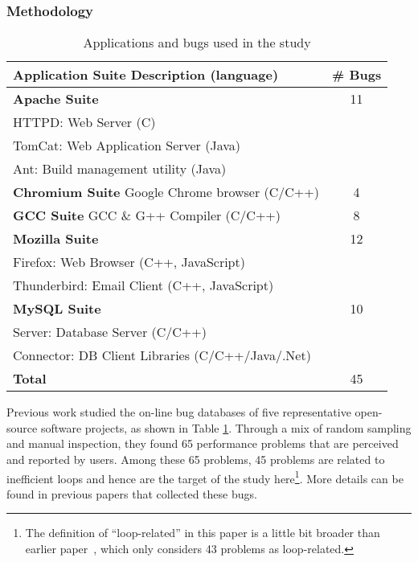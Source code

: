 \subsubsection{Methodology}
\begin{table}[h!]
\small{
\centering
\begin{tabular}{@{\hspace{3pt}}l@{\hspace{3pt}}|@{\hspace{3pt}}c@{\hspace{3pt}}}
\hline
Application Suite Description (language) & \# Bugs \\
\hline                            
{\bf Apache Suite} 	 & 11\\
{HTTPD:	Web Server (C)	}& \\
{TomCat:  Web Application Server (Java)}& \\
{Ant:	Build management utility (Java)}& \\
\hline                            
{\bf Chromium Suite} Google Chrome browser (C/C++) & 4\\
\hline
{\bf GCC Suite}  GCC \& G++ Compiler (C/C++)     & 8\\
\hline
{\bf Mozilla Suite}  & 12\\
{Firefox: Web Browser (C++, JavaScript)}& 	\\
{Thunderbird: Email Client (C++, JavaScript)}& \\
\hline
{\bf MySQL Suite}     & 10	\\
{Server: Database Server (C/C++)}&  	\\
{Connector: DB Client Libraries (C/C++/Java/.Net)} &  	\\
\hline
{\bf Total}	   & 45 \\
\hline
\end{tabular}
}
\caption{Applications and bugs used in the study}
\label{tab:app_bug}
\end{table}

Previous work \cite{PerfBug,SongOOPSLA2014} studied the on-line bug
databases of five representative open-source software projects, as 
shown in Table \ref{tab:app_bug}. Through a mix of random sampling and 
manual inspection, they 
found 65 performance problems that are perceived and reported by users. 
Among these 65 problems, 45 problems are related to inefficient loops and 
hence are the target of the study 
here\footnote{The definition of ``loop-related'' in this paper is a little
bit broader than earlier paper~\cite{SongOOPSLA2014}, which only considers
43 problems as loop-related. }.
More details can be found in previous papers that collected
these bugs. 

